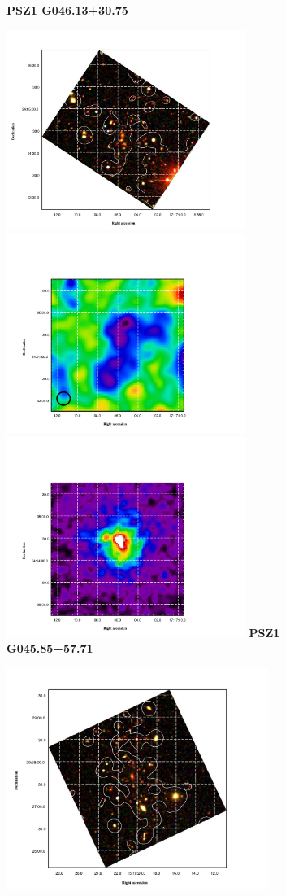 \documentclass[11pt,a4paper,twoside,graphicx,color]{article}
\begin{document}
\begin{figure}[h!]
	\centering
	\textbf{PSZ1 G046.13+30.75}\par\medskip
	\includegraphics[trim=-0.5cm 0cm 3.5cm 0cm, clip=true, height=6.5cm]{PSZ1G046_SDSS.pdf}
	\includegraphics[trim=2.5cm 0cm 6cm 0cm, clip=true,height=6.5cm]{PSZ1G046_NIKA.pdf}
	\includegraphics[trim=2.5cm 0cm 6cm 0cm, clip=true,height=6.5cm]{PSZ1G046_XMM.pdf}
	\textbf{PSZ1 G045.85+57.71}\par\medskip
	\includegraphics[trim=0.8cm 0cm 3.8cm 0cm, clip=true, height=7.2cm]{PSZ1G045_SDSS.pdf}

\end{figure}
\end{document}
